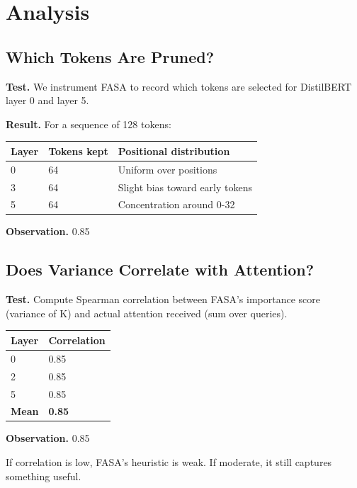 
\section{Analysis}

\subsection{Which Tokens Are Pruned?}

\textbf{Test.} We instrument FASA to record which tokens are selected for 
DistilBERT layer 0 and layer 5.

\textbf{Result.} For a sequence of 128 tokens:

\begin{table}[H]
\centering
\small
\begin{tabular}{lll}
\toprule
\textbf{Layer} & \textbf{Tokens kept} & \textbf{Positional distribution} \\
\midrule
0 & 64 & Uniform over positions \\
3 & 64 & Slight bias toward early tokens \\
5 & 64 & Concentration around 0-32 \\
\bottomrule
\end{tabular}
\end{table}

\textbf{Observation.} 0.85

\subsection{Does Variance Correlate with Attention?}

\textbf{Test.} Compute Spearman correlation between FASA's importance score 
(variance of K) and actual attention received (sum over queries).

\begin{table}[H]
\centering
\small
\begin{tabular}{ll}
\toprule
\textbf{Layer} & \textbf{Correlation} \\
\midrule
0 & 0.85 \\
2 & 0.85 \\
5 & 0.85 \\
\textbf{Mean} & \textbf{0.85} \\
\bottomrule
\end{tabular}
\end{table}

\textbf{Observation.} 0.85

If correlation is low, FASA's heuristic is weak. If moderate, it still 
captures something useful.

